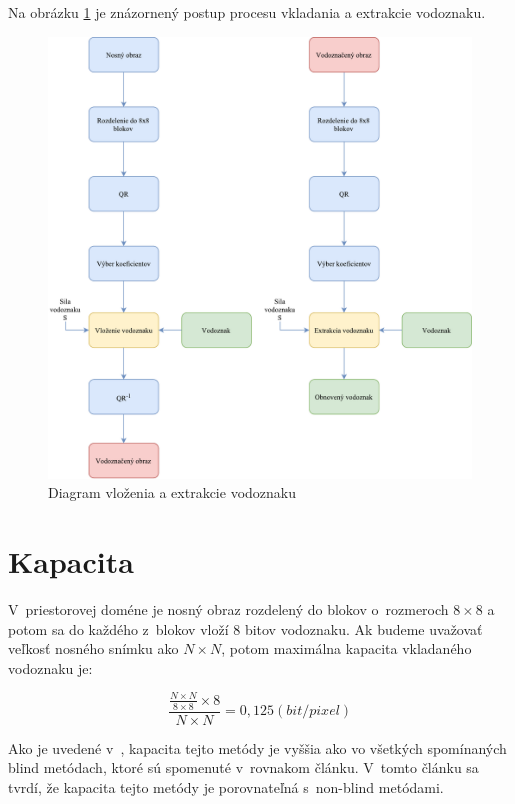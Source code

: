 Na obrázku \ref{fig:embed-extract} je znázornený postup procesu vkladania a extrakcie vodoznaku.

\begin{figure}
    \centering
    \includegraphics[scale=0.59]{obrazky/embed-extract}
    \caption{Diagram vloženia a extrakcie vodoznaku}
    \label{fig:embed-extract}
\end{figure}

\clearpage
\section{Kapacita}
V~priestorovej doméne je nosný obraz rozdelený do blokov o~rozmeroch $8\times8$ a potom sa do každého z~blokov vloží 8 bitov vodoznaku. Ak budeme uvažovať veľkosť nosného snímku ako $N\times N$, potom maximálna kapacita vkladaného vodoznaku je:

\begin{equation}
\frac{\frac{N\times N}{8\times 8}\times 8}{N \times N} =  0,125(bit/pixel)
\end{equation}

Ako je uvedené v~\cite{QRdecomposition}, kapacita tejto metódy je vyššia ako vo všetkých spomínaných blind metódach, ktoré sú spomenuté v~rovnakom článku. V~tomto článku sa tvrdí, že kapacita tejto metódy je porovnateľná s~non-blind metódami.

